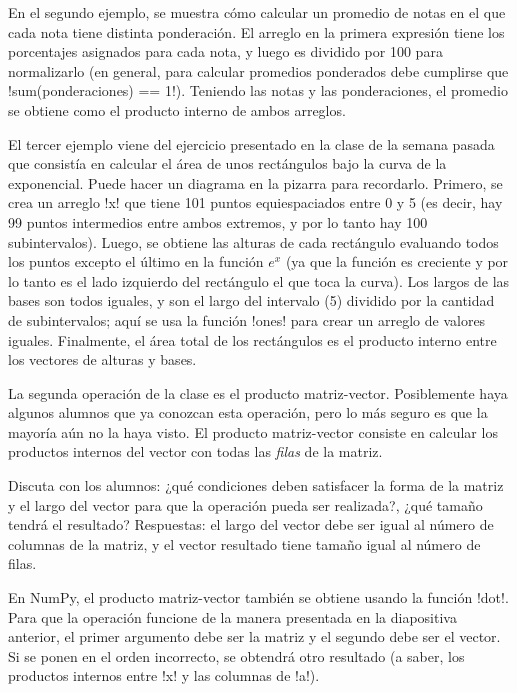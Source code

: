 \documentclass[10pt]{article}
\begin{document}
  En el segundo ejemplo,
  se muestra cómo calcular un promedio de notas
  en el que cada nota tiene distinta ponderación.
  El arreglo en la primera expresión
  tiene los porcentajes asignados para cada nota,
  y luego es dividido por 100 para normalizarlo
  (en general, para calcular promedios ponderados
  debe cumplirse que \li!sum(ponderaciones) == 1!).
  Teniendo las notas y las ponderaciones,
  el promedio se obtiene como el producto interno
  de ambos arreglos.

  El tercer ejemplo
  viene del ejercicio presentado en la clase de la semana pasada
  que consistía en calcular el área de unos rectángulos
  bajo la curva de la exponencial.
  Puede hacer un diagrama en la pizarra para recordarlo.
  Primero, se crea un arreglo \li!x!
  que tiene 101 puntos equiespaciados entre 0 y 5
  (es decir, hay 99 puntos intermedios entre ambos extremos,
  y por lo tanto hay 100 subintervalos).
  Luego,
  se obtiene las alturas de cada rectángulo
  evaluando todos los puntos excepto el último en la función \(e^x\)
  (ya que la función es creciente
  y por lo tanto es el lado izquierdo del rectángulo
  el que toca la curva).
  Los largos de las bases son todos iguales,
  y son el largo del intervalo (5) dividido por la cantidad de subintervalos;
  aquí se usa la función \li!ones! para crear un arreglo de valores iguales.
  Finalmente, el área total de los rectángulos
  es el producto interno entre los vectores de alturas y bases.


  La segunda operación de la clase
  es el producto matriz-vector.
  Posiblemente haya algunos alumnos que ya conozcan esta operación,
  pero lo más seguro es que la mayoría aún no la haya visto.
  El producto matriz-vector
  consiste en calcular los productos internos del vector
  con todas las \emph{filas} de la matriz.

  Discuta con los alumnos:
  ¿qué condiciones deben satisfacer la forma de la matriz
  y el largo del vector para que la operación pueda ser realizada?,
  ¿qué tamaño tendrá el resultado?
  Respuestas: el largo del vector
  debe ser igual al número de columnas de la matriz,
  y el vector resultado tiene tamaño igual
  al número de filas.


  En NumPy, el producto matriz-vector
  también se obtiene usando la función \li!dot!.
  Para que la operación funcione de la manera presentada
  en la diapositiva anterior,
  el primer argumento debe ser la matriz
  y el segundo debe ser el vector.
  Si se ponen en el orden incorrecto,
  se obtendrá otro resultado
  (a saber, los productos internos
  entre \li!x! y las columnas de \li!a!).
\end{document}
